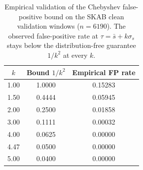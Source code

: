 \begin{table}[H]
\centering
\caption{Empirical validation of the Chebyshev false-positive bound on the SKAB clean validation windows ($n=6190$). The observed false-positive rate at $\tau=\bar{s}+k\sigma_s$ stays below the distribution-free guarantee $1/k^2$ at every $k$.}
\label{table:chebyshev_calib}
\setlength{\tabcolsep}{8pt}\small
\begin{tabular}{ccc}
\toprule
\textbf{$k$} & \textbf{Bound $1/k^2$} & \textbf{Empirical FP rate} \\
\midrule
1.00 & 1.0000 & 0.15283 \\
1.50 & 0.4444 & 0.05945 \\
2.00 & 0.2500 & 0.01858 \\
3.00 & 0.1111 & 0.00032 \\
4.00 & 0.0625 & 0.00000 \\
4.47 & 0.0500 & 0.00000 \\
5.00 & 0.0400 & 0.00000 \\
\bottomrule
\end{tabular}
\end{table}
